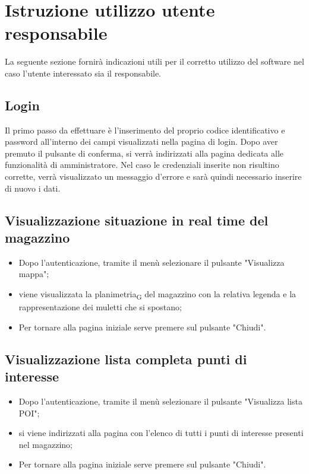 \section{Istruzione utilizzo utente responsabile}

La seguente sezione fornirà indicazioni utili per il corretto utilizzo del software nel caso l'utente interessato sia il responsabile.

\subsection{Login}
Il primo passo da effettuare è l'inserimento del proprio codice identificativo e password all'interno dei campi visualizzati nella pagina di login. Dopo aver premuto il pulsante di conferma, si verrà indirizzati alla pagina dedicata alle funzionalità di amministratore. Nel caso le credenziali inserite non risultino corrette, verrà visualizzato un messaggio d'errore e sarà quindi necessario inserire di nuovo i dati.

\subsection{Visualizzazione situazione in real time del magazzino}
\begin{itemize}
    \item Dopo l'autenticazione, tramite il menù selezionare il pulsante "Visualizza mappa";
    \item viene visualizzata la planimetria\textsubscript{G} del magazzino con la relativa legenda e la rappresentazione dei muletti che si spostano;
    \item Per tornare alla pagina iniziale serve premere sul pulsante "Chiudi".
\end{itemize}
\subsection{Visualizzazione lista completa punti di interesse}
\begin{itemize}
    \item Dopo l'autenticazione, tramite il menù selezionare il pulsante "Visualizza lista POI";
    \item si viene indirizzati alla pagina con l'elenco di tutti i punti di interesse presenti nel magazzino;
    \item Per tornare alla pagina iniziale serve premere sul pulsante "Chiudi".
\end{itemize}

